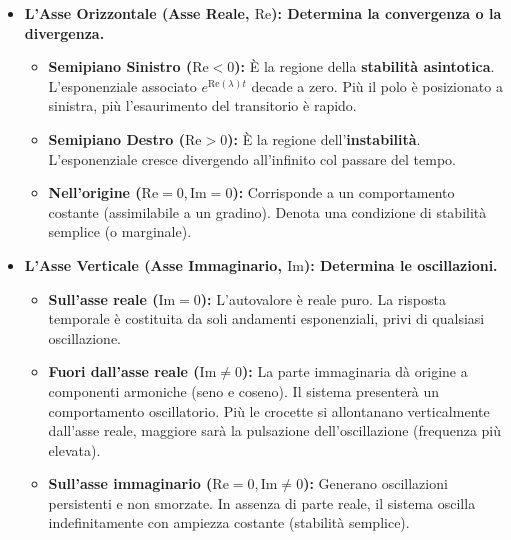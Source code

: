 \documentclass[a4paper,12pt]{article}
\begin{document}
	\begin{itemize}
		\item \textbf{L'Asse Orizzontale (Asse Reale, $\text{Re}$): Determina la convergenza o la divergenza.}
		\begin{itemize}
			\item \textbf{Semipiano Sinistro ($\text{Re} < 0$):} È la regione della \textbf{stabilità asintotica}. L'esponenziale associato $e^{\text{Re}(\lambda)t}$ decade a zero. Più il polo è posizionato a sinistra, più l'esaurimento del transitorio è rapido.
			\item \textbf{Semipiano Destro ($\text{Re} > 0$):} È la regione dell'\textbf{instabilità}. L'esponenziale cresce divergendo all'infinito col passare del tempo.
			\item \textbf{Nell'origine ($\text{Re} = 0, \text{Im} = 0$):} Corrisponde a un comportamento costante (assimilabile a un gradino). Denota una condizione di stabilità semplice (o marginale).
		\end{itemize}
		
		\vspace{0.3cm}
		
		\item \textbf{L'Asse Verticale (Asse Immaginario, $\text{Im}$): Determina le oscillazioni.}
		\begin{itemize}
			\item \textbf{Sull'asse reale ($\text{Im} = 0$):} L'autovalore è reale puro. La risposta temporale è costituita da soli andamenti esponenziali, privi di qualsiasi oscillazione.
			\item \textbf{Fuori dall'asse reale ($\text{Im} \neq 0$):} La parte immaginaria dà origine a componenti armoniche (seno e coseno). Il sistema presenterà un comportamento oscillatorio. Più le crocette si allontanano verticalmente dall'asse reale, maggiore sarà la pulsazione dell'oscillazione (frequenza più elevata).
			\item \textbf{Sull'asse immaginario ($\text{Re} = 0, \text{Im} \neq 0$):} Generano oscillazioni persistenti e non smorzate. In assenza di parte reale, il sistema oscilla indefinitamente con ampiezza costante (stabilità semplice).
		\end{itemize}
	\end{itemize}
\end{document}
